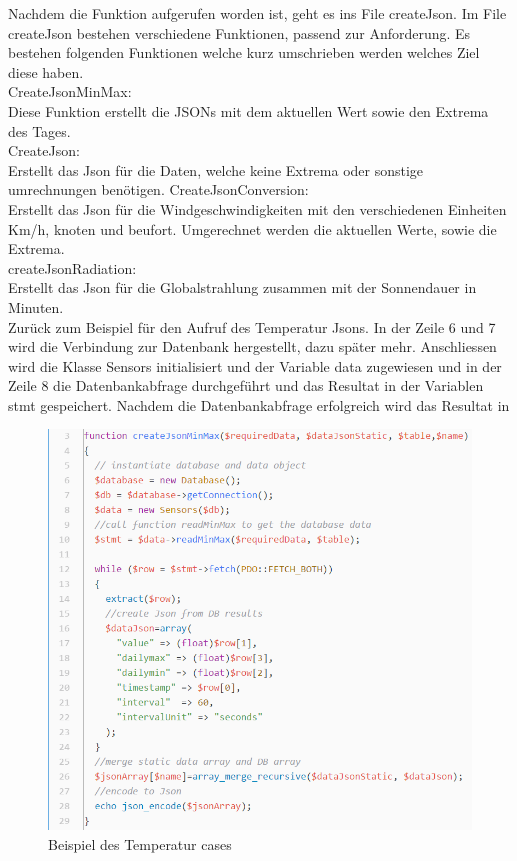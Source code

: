 Nachdem die Funktion aufgerufen worden ist, geht es ins File createJson. Im File createJson bestehen verschiedene Funktionen, passend zur Anforderung. Es bestehen folgenden Funktionen welche kurz umschrieben werden welches Ziel diese haben.\\ 

CreateJsonMinMax:\\
Diese Funktion erstellt die JSONs mit dem aktuellen Wert sowie den Extrema des Tages.\\
CreateJson:\\
Erstellt das Json für die Daten, welche keine Extrema oder sonstige umrechnungen benötigen. 
CreateJsonConversion:\\
Erstellt das Json für die Windgeschwindigkeiten mit den verschiedenen Einheiten Km/h, knoten und beufort. Umgerechnet werden die aktuellen Werte, sowie die Extrema.\\
createJsonRadiation:\\
Erstellt das Json für die Globalstrahlung zusammen mit der Sonnendauer in Minuten.\\

Zurück zum Beispiel für den Aufruf des Temperatur Jsons. In der Zeile 6 und 7 wird die Verbindung zur Datenbank hergestellt, dazu später mehr. Anschliessen wird die Klasse Sensors initialisiert und der Variable data zugewiesen und in der Zeile 8 die Datenbankabfrage durchgeführt und das Resultat in der Variablen stmt gespeichert. Nachdem die Datenbankabfrage erfolgreich wird das Resultat in 

\begin{figure}[h!]
	\centering
	\includegraphics[width=1\linewidth]{img/API_temperature_code_createJson}
	\caption{Beispiel des Temperatur cases}
	\label{img:wetterstation}
\end{figure}


